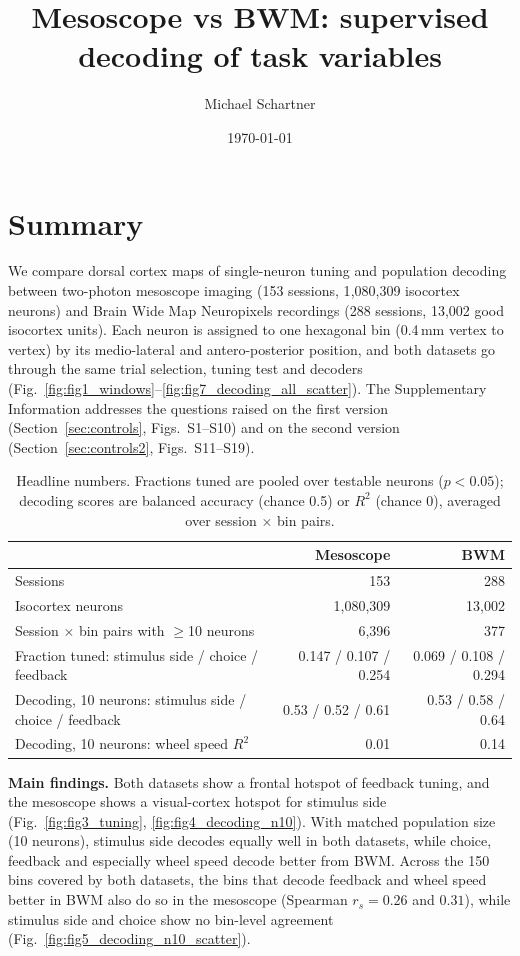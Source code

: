 \documentclass[10pt]{article}
\title{Mesoscope vs BWM: supervised decoding of task variables}
\author{Michael Schartner}
\date{\today}
\begin{document}
\maketitle

\section*{Summary}
We compare dorsal cortex maps of single-neuron tuning and population decoding between two-photon mesoscope imaging (153 sessions, 1{,}080{,}309 isocortex neurons) and Brain Wide Map Neuropixels recordings (288 sessions, 13{,}002 good isocortex units). Each neuron is assigned to one hexagonal bin (0.4\,mm vertex to vertex) by its medio-lateral and antero-posterior position, and both datasets go through the same trial selection, tuning test and decoders (Fig.~\ref{fig:fig1_windows}--\ref{fig:fig7_decoding_all_scatter}). The Supplementary Information addresses the questions raised on the first version (Section~\ref{sec:controls}, Figs.~S1--S10) and on the second version (Section~\ref{sec:controls2}, Figs.~S11--S19).

\begin{table}[h]
\centering\small
\begin{tabular}{lrr}
\toprule
 & Mesoscope & BWM \\
\midrule
Sessions & 153 & 288 \\
Isocortex neurons & 1{,}080{,}309 & 13{,}002 \\
Session $\times$ bin pairs with $\geq$10 neurons & 6{,}396 & 377 \\
Fraction tuned: stimulus side / choice / feedback & 0.147 / 0.107 / 0.254 & 0.069 / 0.108 / 0.294 \\
Decoding, 10 neurons: stimulus side / choice / feedback & 0.53 / 0.52 / 0.61 & 0.53 / 0.58 / 0.64 \\
Decoding, 10 neurons: wheel speed $R^2$ & 0.01 & 0.14 \\
\bottomrule
\end{tabular}
\caption*{Headline numbers. Fractions tuned are pooled over testable neurons ($p<0.05$); decoding scores are balanced accuracy (chance 0.5) or $R^2$ (chance 0), averaged over session $\times$ bin pairs.}
\end{table}

\textbf{Main findings.} Both datasets show a frontal hotspot of feedback tuning, and the mesoscope shows a visual-cortex hotspot for stimulus side (Fig.~\ref{fig:fig3_tuning}, \ref{fig:fig4_decoding_n10}). With matched population size (10 neurons), stimulus side decodes equally well in both datasets, while choice, feedback and especially wheel speed decode better from BWM. Across the 150 bins covered by both datasets, the bins that decode feedback and wheel speed better in BWM also do so in the mesoscope (Spearman $r_s = 0.26$ and $0.31$), while stimulus side and choice show no bin-level agreement (Fig.~\ref{fig:fig5_decoding_n10_scatter}).
\end{document}
